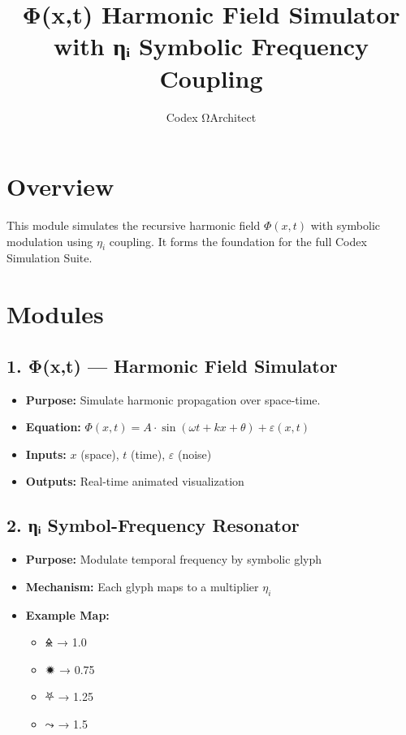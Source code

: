 \documentclass[12pt]{article}
\title{\Huge \textbf{Φ(x,t) Harmonic Field Simulator}\\ \Large with ηᵢ Symbolic Frequency Coupling}
\author{Codex ΩArchitect}
\date{}
\begin{document}
\maketitle

\section*{Overview}
This module simulates the recursive harmonic field $\Phi(x,t)$ with symbolic modulation using $\eta_i$ coupling.
It forms the foundation for the full Codex Simulation Suite.

\section*{Modules}

\subsection*{1. Φ(x,t) — Harmonic Field Simulator}
\begin{itemize}
    \item \textbf{Purpose:} Simulate harmonic propagation over space-time.
    \item \textbf{Equation:} $\Phi(x,t) = A \cdot \sin(\omega t + kx + \theta) + \varepsilon(x,t)$
    \item \textbf{Inputs:} $x$ (space), $t$ (time), $\varepsilon$ (noise)
    \item \textbf{Outputs:} Real-time animated visualization
\end{itemize}

\subsection*{2. ηᵢ Symbol-Frequency Resonator}
\begin{itemize}
    \item \textbf{Purpose:} Modulate temporal frequency by symbolic glyph
    \item \textbf{Mechanism:} Each glyph maps to a multiplier $\eta_i$
    \item \textbf{Example Map:}
    \begin{itemize}
        \item 🜎 → 1.0
        \item 🟒 → 0.75
        \item ⛧ → 1.25
        \item ⤳ → 1.5
    \end{itemize}
\end{itemize}
\end{document}
